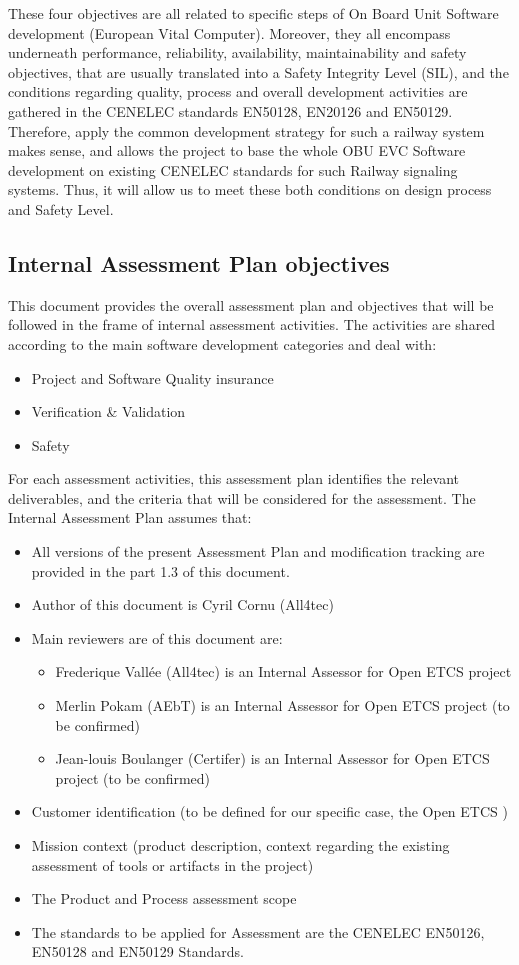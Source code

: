 \documentclass{template/openetcs_article}
\begin{document}
These four objectives are all related to specific steps of On Board Unit Software development (European Vital Computer). Moreover, they all encompass underneath performance, reliability, availability, maintainability and safety objectives, that are usually translated into a Safety Integrity Level (SIL), and the conditions regarding quality, process and overall development activities are gathered in the CENELEC standards EN50128, EN20126 and EN50129.
Therefore, apply the common development strategy for such a railway system makes sense, and allows the project to base the whole OBU EVC Software development on existing CENELEC standards for such Railway signaling systems. Thus, it will allow us to meet these both conditions on design process and Safety Level.

\subsection{Internal Assessment Plan objectives}
This document provides the overall assessment plan and objectives that will be followed in the frame of internal assessment activities.
The activities are shared according to the main software development categories and deal with:
\begin{itemize}
\item Project and Software Quality insurance
\item Verification \& Validation
\item Safety
\end{itemize}

For each assessment activities, this assessment plan identifies the relevant deliverables, and the criteria that will be considered for the assessment.
The Internal Assessment Plan assumes that: 
\begin{itemize}
\item All versions of the present Assessment Plan and modification tracking are provided in the part 1.3 of this document.
\item Author of this document is Cyril Cornu (All4tec)
\item Main reviewers are of this document are:
	\begin{itemize}
	\item Frederique Vall\'ee (All4tec) is an Internal Assessor for Open ETCS project
	\item Merlin Pokam (AEbT) is an Internal Assessor for Open ETCS project (to be confirmed)
	\item Jean-louis Boulanger (Certifer) is an Internal Assessor for Open ETCS project (to be confirmed)
	\end{itemize}
\item Customer identification (to be defined for our specific case, the Open ETCS )
\item Mission context (product description, context regarding the existing assessment of tools or artifacts in the project)
\item The Product and Process assessment scope
\item The standards to be applied for Assessment are the CENELEC EN50126, EN50128 and EN50129 Standards.
\end{itemize}
\end{document}
